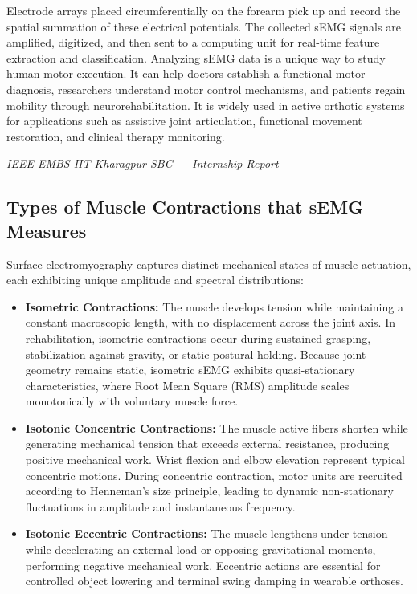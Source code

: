 \documentclass[12pt,a4paper]{article}
\begin{document}
Electrode arrays placed circumferentially on the forearm pick up and record the spatial summation of these electrical potentials. The collected sEMG signals are amplified, digitized, and then sent to a computing unit for real-time feature extraction and classification. Analyzing sEMG data is a unique way to study human motor execution. It can help doctors establish a functional motor diagnosis, researchers understand motor control mechanisms, and patients regain mobility through neurorehabilitation. It is widely used in active orthotic systems for applications such as assistive joint articulation, functional movement restoration, and clinical therapy monitoring.

\vfill
\begin{center}
    \footnotesize\textit{IEEE EMBS IIT Kharagpur SBC --- Internship Report}
\end{center}

\newpage
\subsection{Types of Muscle Contractions that sEMG Measures}

Surface electromyography captures distinct mechanical states of muscle actuation, each exhibiting unique amplitude and spectral distributions:
\begin{itemize}[leftmargin=*]
    \item \textbf{Isometric Contractions:} The muscle develops tension while maintaining a constant macroscopic length, with no displacement across the joint axis. In rehabilitation, isometric contractions occur during sustained grasping, stabilization against gravity, or static postural holding. Because joint geometry remains static, isometric sEMG exhibits quasi-stationary characteristics, where Root Mean Square (RMS) amplitude scales monotonically with voluntary muscle force.
    \item \textbf{Isotonic Concentric Contractions:} The muscle active fibers shorten while generating mechanical tension that exceeds external resistance, producing positive mechanical work. Wrist flexion and elbow elevation represent typical concentric motions. During concentric contraction, motor units are recruited according to Henneman's size principle, leading to dynamic non-stationary fluctuations in amplitude and instantaneous frequency.
    \item \textbf{Isotonic Eccentric Contractions:} The muscle lengthens under tension while decelerating an external load or opposing gravitational moments, performing negative mechanical work. Eccentric actions are essential for controlled object lowering and terminal swing damping in wearable orthoses.
\end{itemize}
\end{document}
